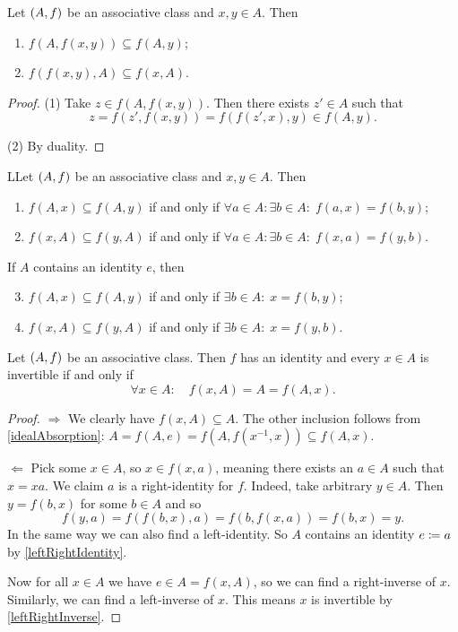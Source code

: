 \begin{lemma} \label{idealAbsorption}
Let $\left( A, f \right)$ be an associative class and $x, y\in A$. Then
\begin{enumerate}
\item $f(A, f(x,y)) \subseteq f(A, y)$;
\item $f(f(x,y), A) \subseteq f(x, A)$.
\end{enumerate}
\end{lemma}
\begin{proof}
(1) Take $z\in f(A, f(x,y))$. Then there exists $z'\in A$ such that
\[ z = f(z', f(x,y)) = f(f(z', x), y) \in f(A, y). \]

(2) By duality.
\end{proof}

\begin{lemma}
LLet $\left( A, f \right)$ be an associative class and $x, y\in A$. Then
\begin{enumerate}
\item $f(A, x) \subseteq f(A,y)$ \textup{if and only if} $\forall a\in A: \exists b\in A: \; f(a, x) = f(b, y)$;
\item $f(x, A) \subseteq f(y, A)$ \textup{if and only if} $\forall a\in A: \exists b\in A: \; f(x, a) = f(y, b)$.
\end{enumerate}
If $A$ contains an identity $e$, then
\begin{enumerate} \setcounter{enumi}{2}
\item $f(A, x) \subseteq f(A,y)$ \textup{if and only if} $\exists b\in A: \; x = f(b, y)$;
\item $f(x, A) \subseteq f(y, A)$ \textup{if and only if} $\exists b\in A: \; x = f(y, b)$.
\end{enumerate}
\end{lemma}

\begin{proposition} \label{invertibilityFromPrincipalIdeals}
Let $\left( A, f \right)$ be an associative class. Then $f$ has an identity and every $x\in A$ is invertible \textup{if and only if}
\[ \forall x\in A: \quad f(x, A) = A = f(A,x). \]
\end{proposition}
\begin{proof}
$\Rightarrow$ We clearly have $f(x, A) \subseteq A$. The other inclusion follows from \ref{idealAbsorption}: $A = f(A, e) = f(A, f(x^{-1}, x)) \subseteq f(A, x)$.

$\Leftarrow$ Pick some $x\in A$, so $x\in f(x,a)$, meaning there exists an $a\in A$ such that $x = xa$. We claim $a$ is a right-identity for $f$. Indeed, take arbitrary $y\in A$. Then $y = f(b,x)$ for some $b\in A$ and so
\[ f(y, a) = f(f(b,x), a) = f(b,f(x,a)) = f(b,x) = y. \]
In the same way we can also find a left-identity. So $A$ contains an identity $e \coloneqq a$ by \ref{leftRightIdentity}.

Now for all $x\in A$ we have $e\in A = f(x,A)$, so we can find a right-inverse of $x$. Similarly, we can find a left-inverse of $x$. This means $x$ is invertible by \ref{leftRightInverse}.
\end{proof}


